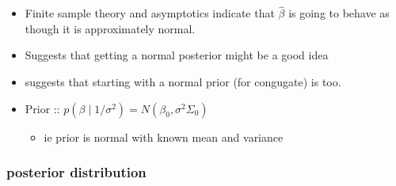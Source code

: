 \documentclass[11pt]{article}
\begin{document}
\begin{itemize}
\item Finite sample theory and asymptotics indicate that
       $\hat{\beta}$ is going to behave as though it is approximately normal.
\item Suggests that getting a normal posterior might be a good idea
\item suggests that starting with a normal prior (for congugate) is too.
\item Prior :: $p(\beta \mid 1/\sigma^{2}) = N(\beta_{0}, \sigma^2 \Sigma_{0})$
\begin{itemize}
\item ie prior is normal with known mean and variance
\end{itemize}
\end{itemize}
\subsubsection{posterior distribution}
\label{sec-4-1-1}
\end{document}
